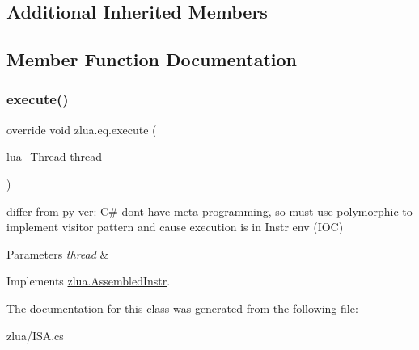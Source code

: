 \subsection*{Additional Inherited Members}


\subsection{Member Function Documentation}
\mbox{\label{classzlua_1_1eq_a802b2377436b97b137b50c36b2867d29}} 
\subsubsection{\texorpdfstring{execute()}{execute()}}
{\footnotesize\ttfamily override void zlua.\+eq.\+execute (\begin{DoxyParamCaption}\item[{\mbox{\hyperlink{classzlua_1_1lua___thread}{lua\+\_\+\+Thread}}}]{thread }\end{DoxyParamCaption})\hspace{0.3cm}{\ttfamily [virtual]}}



differ from py ver\+: C\# dont have meta programming, so must use polymorphic to implement visitor pattern and cause execution is in Instr env (I\+OC) 


\begin{DoxyParams}{Parameters}
{\em thread} & \\
\hline
\end{DoxyParams}


Implements \mbox{\hyperlink{classzlua_1_1_assembled_instr_a44e081c4565b90b75e4a67b8dd418feb}{zlua.\+Assembled\+Instr}}.



The documentation for this class was generated from the following file\+:\begin{DoxyCompactItemize}
\item 
zlua/I\+S\+A.\+cs\end{DoxyCompactItemize}
